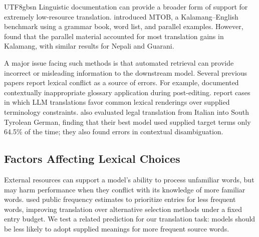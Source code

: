 \documentclass[11pt]{article}
\begin{document}
\begin{CJK*}{UTF8}{gbsn}
Linguistic documentation can provide a broader form of support for extremely 
low-resource translation. 
\citet{tanzer2024grammar} introduced MTOB, a Kalamang--English benchmark using a grammar book, word list, and parallel examples. However, 
\citet{aycock2025grammar} found that the parallel material accounted for most translation gains in Kalamang, with similar results for Nepali and Guarani.

A major issue facing such methods is that automated retrieval 
can 
provide incorrect or misleading information to the downstream model. Several previous papers report lexical conflict as a source of errors. 
For example, \citet{merx2025tulun} documented contextually inappropriate glossary application during post-editing. \citet{huang2024translate} report cases in which LLM translations favor common lexical renderings over supplied terminology constraints. \citet{dinatale2025legistyr} also evaluated legal translation from Italian into South Tyrolean German, finding that their best model used supplied target terms only 64.5\% of the time; they also found errors in contextual disambiguation.

\subsection{Factors Affecting Lexical Choices}
\label{sec:related-factors}

External resources can support a model's ability to process unfamiliar words, but may harm performance when they conflict with its knowledge of more familiar words.
\citet{lu2025slow} used public frequency estimates to prioritize entries for less frequent words, improving translation over alternative selection methods under a fixed entry budget. 
We test a related prediction for our translation task: models should be less likely to adopt supplied meanings for more frequent source words.


\end{CJK*}
\end{document}
